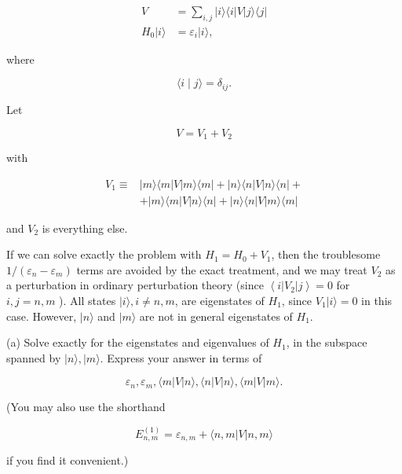 \documentclass[12pt]{article}
\begin{document}
$$
\begin{aligned}
V & =\sum_{i, j}|i\rangle\langle i|V| j\rangle\langle j| \\
H_{0}|i\rangle & =\varepsilon_{i}|i\rangle,
\end{aligned}
$$

where

$$
\langle i \mid j\rangle=\delta_{i j} .
$$

Let

$$
V=V_{1}+V_{2}
$$

with

$$
\begin{aligned}
V_{1} \equiv & |m\rangle\langle m|V| m\rangle\langle m|+| n\rangle\langle n|V| n\rangle\langle n|+ \\
& +|m\rangle\langle m|V| n\rangle\langle n|+| n\rangle\langle n|V| m\rangle\langle m|
\end{aligned}
$$

and $V_{2}$ is everything else.

If we can solve exactly the problem with $H_{1}=H_{0}+V_{1}$, then the troublesome $1 /\left(\varepsilon_{n}-\varepsilon_{m}\right)$ terms are avoided by the exact treatment, and we may treat $V_{2}$ as a perturbation in ordinary perturbation theory (since $\left\langle i\left|V_{2}\right| j\right\rangle=0$ for $i, j=n, m$ ). All states $|i\rangle, i \neq n, m$, are eigenstates of $H_{1}$, since $V_{1}|i\rangle=0$ in this case. However, $|n\rangle$ and $|m\rangle$ are not in general eigenstates of $H_{1}$.

(a) Solve exactly for the eigenstates and eigenvalues of $H_{1}$, in the subspace spanned by $|n\rangle,|m\rangle$. Express your answer in terms of

$$
\varepsilon_{n}, \varepsilon_{m},\langle m|V| n\rangle,\langle n|V| n\rangle,\langle m|V| m\rangle .
$$

(You may also use the shorthand

$$
E_{n, m}^{(1)}=\varepsilon_{n, m}+\langle n, m|V| n, m\rangle
$$

if you find it convenient.)
\end{document}
